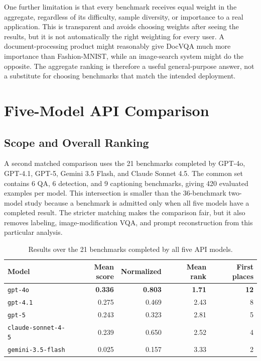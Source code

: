 ﻿\documentclass[11pt,a4paper]{article}
\begin{document}
One further limitation is that every benchmark receives equal weight in the
aggregate, regardless of its difficulty, sample diversity, or importance to
a real application. This is transparent and avoids choosing weights after
seeing the results, but it is not automatically the right weighting for every
user. A document-processing product might reasonably give DocVQA much more
importance than Fashion-MNIST, while an image-search system might do the
opposite. The aggregate ranking is therefore a useful general-purpose answer,
not a substitute for choosing benchmarks that match the intended deployment.

\section{Five-Model API Comparison}

\subsection{Scope and Overall Ranking}

A second matched comparison uses the 21 benchmarks completed by GPT-4o,
GPT-4.1, GPT-5, Gemini 3.5 Flash, and Claude Sonnet 4.5. The common set
contains 6 QA, 6 detection, and 9 captioning benchmarks, giving 420 evaluated
examples per model. This intersection is smaller than the 36-benchmark
two-model study because a benchmark is admitted only when all five models
have a completed result. The stricter matching makes the comparison fair,
but it also removes labeling, image-modification VQA, and prompt
reconstruction from this particular analysis.

\begin{table}[H]
\centering
\small
\caption{Results over the 21 benchmarks completed by all five API models.}
\label{tab:five-api-models}
\begin{tabularx}{\textwidth}{@{}Xrrrr@{}}
\toprule
\textbf{Model} & \textbf{Mean score} & \textbf{Normalized} &
\textbf{Mean rank} & \textbf{First places} \\
\midrule
\texttt{gpt-4o} & \textbf{0.336} & \textbf{0.803} & \textbf{1.71} & \textbf{12} \\
\texttt{gpt-4.1} & 0.275 & 0.469 & 2.43 & 8 \\
\texttt{gpt-5} & 0.243 & 0.323 & 2.81 & 5 \\
\texttt{claude-sonnet-4-5} & 0.239 & 0.650 & 2.52 & 4 \\
\texttt{gemini-3.5-flash} & 0.025 & 0.157 & 3.33 & 2 \\
\bottomrule
\end{tabularx}
\end{table}
\end{document}
